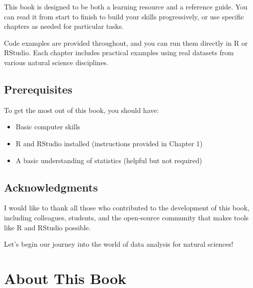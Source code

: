 \documentclass[
  letterpaper,
]{book}
\providecommand{\tightlist}{%
  \setlength{\itemsep}{0pt}\setlength{\parskip}{0pt}}
\begin{document}

This book is designed to be both a learning resource and a reference
guide. You can read it from start to finish to build your skills
progressively, or use specific chapters as needed for particular tasks.

Code examples are provided throughout, and you can run them directly in
R or RStudio. Each chapter includes practical examples using real
datasets from various natural science disciplines.

\section*{Prerequisites}\label{prerequisites}


To get the most out of this book, you should have:

\begin{itemize}
\tightlist
\item
  Basic computer skills
\item
  R and RStudio installed (instructions provided in Chapter 1)
\item
  A basic understanding of statistics (helpful but not required)
\end{itemize}

\section*{Acknowledgments}\label{acknowledgments}


I would like to thank all those who contributed to the development of
this book, including colleagues, students, and the open-source community
that makes tools like R and RStudio possible.

Let's begin our journey into the world of data analysis for natural
sciences!


\chapter*{About This Book}\label{about-this-book}

\end{document}
